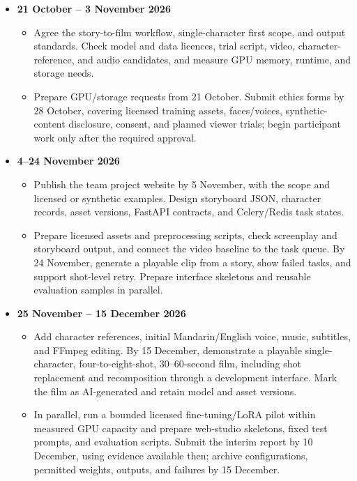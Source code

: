 \documentclass[a4paper,12pt]{article}
\begin{document}
\begin{itemize}
  \item \textbf{21 October -- 3 November 2026}
    \begin{itemize}
      \item Agree the story-to-film workflow, single-character first scope, and output standards. Check model and data licences, trial script, video, character-reference, and audio candidates, and measure GPU memory, runtime, and storage needs.
      \item Prepare GPU/storage requests from 21 October. Submit ethics forms by 28 October, covering licensed training assets, faces/voices, synthetic-content disclosure, consent, and planned viewer trials; begin participant work only after the required approval.
    \end{itemize}

  \item \textbf{4--24 November 2026}
    \begin{itemize}
      \item Publish the team project website by 5 November, with the scope and licensed or synthetic examples. Design storyboard JSON, character records, asset versions, FastAPI contracts, and Celery/Redis task states.
      \item Prepare licensed assets and preprocessing scripts, check screenplay and storyboard output, and connect the video baseline to the task queue. By 24 November, generate a playable clip from a story, show failed tasks, and support shot-level retry. Prepare interface skeletons and reusable evaluation samples in parallel.
    \end{itemize}

  \item \textbf{25 November -- 15 December 2026}
    \begin{itemize}
      \item Add character references, initial Mandarin/English voice, music, subtitles, and FFmpeg editing. By 15 December, demonstrate a playable single-character, four-to-eight-shot, 30--60-second film, including shot replacement and recomposition through a development interface. Mark the film as AI-generated and retain model and asset versions.
      \item In parallel, run a bounded licensed fine-tuning/LoRA pilot within measured GPU capacity and prepare web-studio skeletons, fixed test prompts, and evaluation scripts. Submit the interim report by 10 December, using evidence available then; archive configurations, permitted weights, outputs, and failures by 15 December.
    \end{itemize}


\end{itemize}
\end{document}
